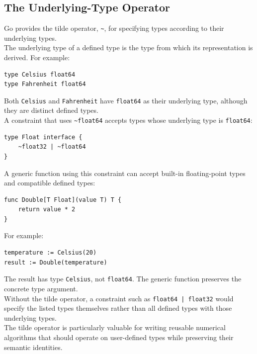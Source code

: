 \subsection{The Underlying-Type Operator}

Go provides the tilde operator, \texttt{\~{}}, for specifying types according to their underlying types.\\

The underlying type of a defined type is the type from which its representation is derived. For example:

\begin{lstlisting}
type Celsius float64
type Fahrenheit float64
\end{lstlisting}

Both \texttt{Celsius} and \texttt{Fahrenheit} have \texttt{float64} as their underlying type, although they are distinct defined types.\\

A constraint that uses \texttt{\~{}float64} accepts types whose underlying type is \texttt{float64}:

\begin{lstlisting}
type Float interface {
    ~float32 | ~float64
}
\end{lstlisting}

A generic function using this constraint can accept built-in floating-point types and compatible defined types:

\begin{lstlisting}
func Double[T Float](value T) T {
    return value * 2
}
\end{lstlisting}

For example:

\begin{lstlisting}
temperature := Celsius(20)
result := Double(temperature)
\end{lstlisting}

The result has type \texttt{Celsius}, not \texttt{float64}. The generic function preserves the concrete type argument.\\

Without the tilde operator, a constraint such as \texttt{float64 | float32} would specify the listed types themselves rather than all defined types with those underlying types.\\

The tilde operator is particularly valuable for writing reusable numerical algorithms that should operate on user-defined types while preserving their semantic identities.\\

